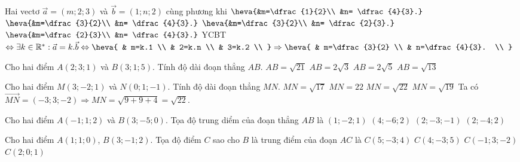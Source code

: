 \begin{ex}
	Hai vectơ $\vec{a}= (m; 2; 3)$ và $\vec{b}= (1; n; 2)$ cùng phương khi
	\choice
	{$\heva{&m=\dfrac{1}{2}\\ &n= \dfrac{4}{3}.}$}
	{\True $\heva{&m=\dfrac{3}{2}\\ &n= \dfrac{4}{3}.}$}
	{$\heva{&m=\dfrac{3}{2}\\ &n= \dfrac{2}{3}.}$}
	{$\heva{&m=\dfrac{2}{3}\\ &n= \dfrac{4}{3}.}$}
	\loigiai
	{
		YCBT $\Leftrightarrow \exists k\in {{\mathbb{R}}^{*}}:\vec{a}=k.\vec{b}\Leftrightarrow \heva{
				& m=k.1 \\
				& 2=k.n \\
				& 3=k.2 \\
			}\Rightarrow \heva{
				& m=\dfrac{3}{2} \\
				& n=\dfrac{4}{3}. \\
			}$
	}
\end{ex} 

\begin{ex}
	Cho hai điểm $A(2;3;1)$ và  $B(3;1;5)$. Tính độ dài đoạn thẳng $AB$.
	\choice
	{\True  $AB= \sqrt{21}$}
	{$AB= 2\sqrt{3}$}
	{$AB= 2\sqrt{5}$}
	{$AB= \sqrt{13}$}
\end{ex} 

\begin{ex}
	Cho hai điểm $M(3;-2;1)$ và $N(0;1;-1)$. Tính độ dài đoạn thẳng $MN$.
	\choice
	{$MN=\sqrt{17}$}
	{$MN=22$}
	{\True $MN=\sqrt{22}$}
	{$MN=\sqrt{19}$}
	\loigiai
	{
		Ta có $\vec{MN}=(-3;3;-2)\Rightarrow MN=\sqrt{9+9+4}=\sqrt{22}$.
	}
\end{ex} 

\begin{ex}
	Cho hai điểm $A(-1;1;2)$ và $B(3;-5;0)$. Tọa độ trung diểm của đoạn thẳng $AB$ là
	\choice
	{\True $(1;-2;1)$}
	{$(4;-6;2)$}
	{$(2;-3;-1)$}
	{$(2;-4;2)$}
\end{ex} 

\begin{ex}
	Cho hai điểm $A(1;1;0)$, $B(3;-1;2)$. Tọa độ điểm $C$ sao cho $B$ là trung điểm của đoạn $AC$ là
	\choice
	{\True $C(5;-3;4)$}
	{$C(4;-3;5)$}
	{$C(-1;3;-2)$}
	{$C(2;0;1)$}
\end{ex} 

